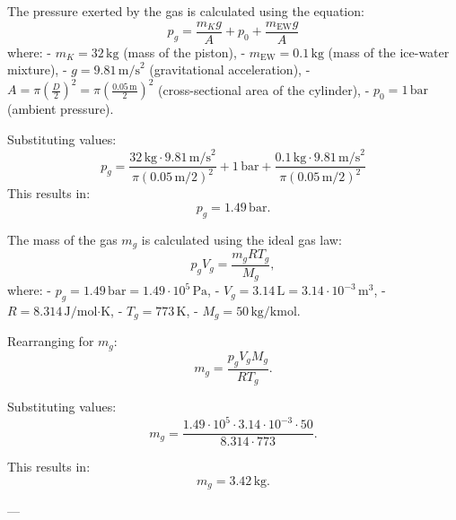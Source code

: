The pressure exerted by the gas is calculated using the equation:  
\[
p_g = \frac{m_K g}{A} + p_0 + \frac{m_{\text{EW}} g}{A}
\]  
where:  
- \( m_K = 32 \, \text{kg} \) (mass of the piston),  
- \( m_{\text{EW}} = 0.1 \, \text{kg} \) (mass of the ice-water mixture),  
- \( g = 9.81 \, \text{m/s}^2 \) (gravitational acceleration),  
- \( A = \pi \left(\frac{D}{2}\right)^2 = \pi \left(\frac{0.05 \, \text{m}}{2}\right)^2 \) (cross-sectional area of the cylinder),  
- \( p_0 = 1 \, \text{bar} \) (ambient pressure).  

Substituting values:  
\[
p_g = \frac{32 \, \text{kg} \cdot 9.81 \, \text{m/s}^2}{\pi \left(0.05 \, \text{m}/2\right)^2} + 1 \, \text{bar} + \frac{0.1 \, \text{kg} \cdot 9.81 \, \text{m/s}^2}{\pi \left(0.05 \, \text{m}/2\right)^2}
\]  
This results in:  
\[
p_g = 1.49 \, \text{bar}.
\]  

The mass of the gas \( m_g \) is calculated using the ideal gas law:  
\[
p_g V_g = \frac{m_g R T_g}{M_g},
\]  
where:  
- \( p_g = 1.49 \, \text{bar} = 1.49 \cdot 10^5 \, \text{Pa} \),  
- \( V_g = 3.14 \, \text{L} = 3.14 \cdot 10^{-3} \, \text{m}^3 \),  
- \( R = 8.314 \, \text{J/mol·K} \),  
- \( T_g = 773 \, \text{K} \),  
- \( M_g = 50 \, \text{kg/kmol} \).  

Rearranging for \( m_g \):  
\[
m_g = \frac{p_g V_g M_g}{R T_g}.
\]  

Substituting values:  
\[
m_g = \frac{1.49 \cdot 10^5 \cdot 3.14 \cdot 10^{-3} \cdot 50}{8.314 \cdot 773}.
\]  

This results in:  
\[
m_g = 3.42 \, \text{kg}.
\]  

---